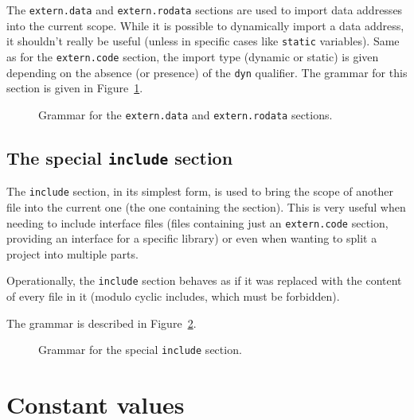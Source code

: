 The \texttt{extern.data} and \texttt{extern.rodata} sections are used to import data addresses into the current scope.
While it is possible to dynamically import a data address, it shouldn't really be useful (unless in specific cases like \texttt{static} variables).
Same as for the \texttt{extern.code} section, the import type (dynamic or static) is given depending on the absence (or presence) of the \texttt{dyn} qualifier.
The grammar for this section is given in Figure~\ref{fig:nstar-common-sections-extern-data-grammar}.

\begin{figure}[htb]
  \centering


  \caption{Grammar for the \texttt{extern.data} and \texttt{extern.rodata} sections.}
  \label{fig:nstar-common-sections-extern-data-grammar}
\end{figure}

\subsection{The special \texttt{include} section}\label{subsec:nstar-common-sections-include}

The \texttt{include} section, in its simplest form, is used to bring the scope of another file into the current one (the one containing the section).
This is very useful when needing to include interface files (files containing just an \texttt{extern.code} section, providing an interface for a specific library) or even when wanting to split a project into multiple parts.

Operationally, the \texttt{include} section behaves as if it was replaced with the content of every file in it (modulo cyclic includes, which must be forbidden).

The grammar is described in Figure~\ref{fig:nstar-common-sections-include-grammar}.

\begin{figure}[htb]
  \centering


  \caption{Grammar for the special \texttt{include} section.}
  \label{fig:nstar-common-sections-include-grammar}
\end{figure}

\section{Constant values}\label{sec:nstar-common-constvalue}

